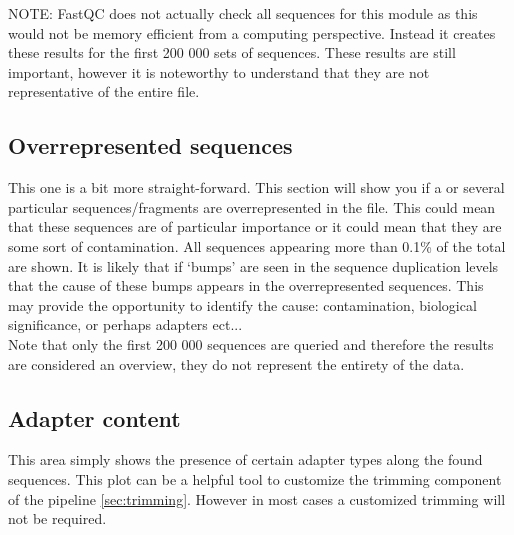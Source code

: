 NOTE: FastQC does not actually check all sequences for this module as this would not be memory efficient from a computing perspective. Instead it creates these results for the first 200 000 sets of sequences. These results are still important, however it is noteworthy to understand that they are not representative of the entire file.

\subsection{Overrepresented sequences \label{subsec:fastqc_overrep}}
This one is a bit more straight-forward. This section will show you if a or several particular sequences/fragments are overrepresented in the file. This could mean that these sequences are of particular importance or it could mean that they are some sort of contamination. All sequences appearing more than 0.1\% of the total are shown. It is likely that if `bumps' are seen in the sequence duplication levels that the cause of these bumps appears in the overrepresented sequences. This may provide the opportunity to identify the cause: contamination, biological significance, or perhaps adapters ect...\\
Note that only the first 200 000 sequences are queried and therefore the results are considered an overview, they do not represent the entirety of the data.


\subsection{Adapter content \label{subsec:fasctqc_Adapter}}
This area simply shows the presence of certain adapter types along the found sequences. This plot can be a helpful tool to customize the trimming component of the pipeline \autoref{sec:trimming}. However in most cases a customized trimming will not be required.

